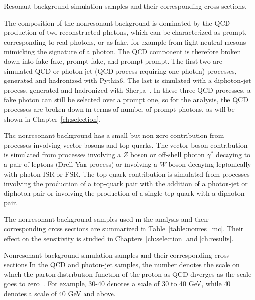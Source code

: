 \begin{table}[ht]
  \centering
  \renewcommand{\arraystretch}{1.4}
  \caption{Resonant background simulation samples and their corresponding cross sections.}
  
  \label{table:smhiggs_mc}
\end{table}

The composition of the nonresonant background is dominated by the QCD production of two
reconstructed photons, which can be characterized as prompt, corresponding to real photons,
or as fake, for example from light neutral mesons mimicking the signature of a photon. The QCD component
is therefore broken down into fake-fake, prompt-fake, and prompt-prompt. The first two are simulated
QCD or photon-jet (QCD process requiring one photon) processes, generated and hadronized with Pythia6.
The last is simulated with a diphoton-jet process, generated and hadronized
with Sherpa~\cite{Gleisberg:2008ta}. In these three QCD processes,
a fake photon can still be selected over a prompt one, so for the analysis, the QCD processes are
broken down in terms of number of prompt photons, as will be shown in Chapter~\ref{ch:selection}.

The nonresonant background has a small but non-zero contribution from processes involving
vector bosons and top quarks. The vector boson contribution is simulated from processes
involving a $Z$ boson or off-shell photon $\gamma^*$ decaying to a pair of leptons (Drell-Yan process)
or involving a $W$ boson decaying leptonically with photon ISR or FSR. The top-quark contribution is
simulated from processes involving the production of a top-quark pair with the addition of a
photon-jet or diphoton pair or involving the production of a single top quark with a diphoton pair.

The nonresonant background samples used in the analysis and their corresponding 
cross sections are summarized in Table~\ref{table:nonres_mc}.
Their effect on the sensitivity is studied in Chapters~\ref{ch:selection} and \ref{ch:results}.

\begin{table}[ht]
  \centering
  \renewcommand{\arraystretch}{1.4}
  \caption{Nonresonant background simulation samples and their corresponding cross sections
In the QCD and photon-jet samples, the number denotes the scale on which the parton
distribution function of the proton as QCD diverges as the scale goes to zero~\cite{Martin:2009iq}.
For example, 30-40 denotes a scale of 30 to 40 GeV, while 40 denotes a scale of 40 GeV and above.}
  
  \label{table:nonres_mc}
\end{table}
